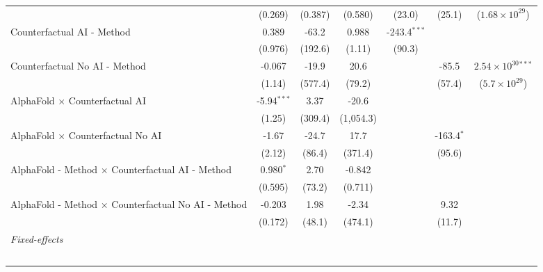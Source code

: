 \begin{tabular}{lcccccc}
                                                              & (0.269)       & (0.387)       & (0.580)    & (23.0)         & (25.1)       & ($1.68\times 10^{29}$)\\    
   Counterfactual AI - Method                                 & 0.389         & -63.2         & 0.988      & -243.4$^{***}$ &              &   \\   
                                                              & (0.976)       & (192.6)       & (1.11)     & (90.3)         &              &   \\   
   Counterfactual No AI - Method                              & -0.067        & -19.9         & 20.6       &                & -85.5        & $2.54\times 10^{30}$$^{***}$\\    
                                                              & (1.14)        & (577.4)       & (79.2)     &                & (57.4)       & ($5.7\times 10^{29}$)\\    
   AlphaFold $\times$ Counterfactual AI                       & -5.94$^{***}$ & 3.37          & -20.6      &                &              &   \\   
                                                              & (1.25)        & (309.4)       & (1,054.3)  &                &              &   \\   
   AlphaFold $\times$ Counterfactual No AI                    & -1.67         & -24.7         & 17.7       &                & -163.4$^{*}$ &   \\   
                                                              & (2.12)        & (86.4)        & (371.4)    &                & (95.6)       &   \\   
   AlphaFold - Method $\times$ Counterfactual AI - Method     & 0.980$^{*}$   & 2.70          & -0.842     &                &              &   \\   
                                                              & (0.595)       & (73.2)        & (0.711)    &                &              &   \\   
   AlphaFold - Method $\times$ Counterfactual No AI - Method  & -0.203        & 1.98          & -2.34      &                & 9.32         &   \\   
                                                              & (0.172)       & (48.1)        & (474.1)    &                & (11.7)       &   \\   
   \midrule
   \emph{Fixed-effects}\\
$$
\end{tabular}
